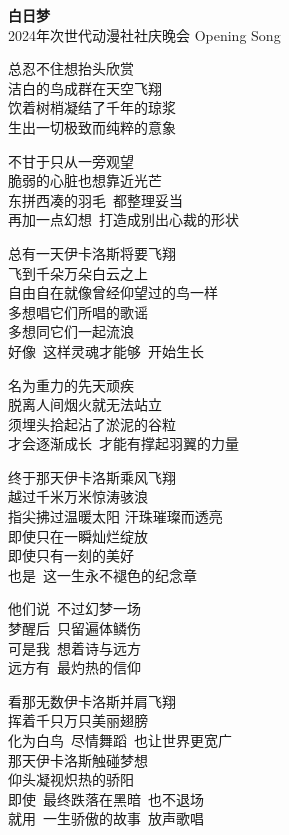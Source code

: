 \newpage  %
\vspace{3em}
\begin{center}
    \fontsize{25pt}{27pt}\selectfont
    \textbf{\textcolor{truepurple}{白日梦}}  %
    \\[0ex]  %
    \fontsize{15pt}{17pt}\selectfont
    \textcolor{thuorange}{2024年次世代动漫社社庆晚会 Opening Song}  %
\end{center}
\flushleft  %
\vspace{2em}
\begin{multicols}{2} 
总忍不住想抬头欣赏\\
洁白的鸟成群在天空飞翔\\
饮着树梢凝结了千年的琼浆\\
生出一切极致而纯粹的意象

\vspace{1em}
不甘于只从一旁观望\\
脆弱的心脏也想靠近光芒\\
东拼西凑的羽毛~都整理妥当\\
再加一点幻想~打造成别出心裁的形状

\vspace{1em}
总有一天伊卡洛斯将要飞翔\\
飞到千朵万朵白云之上\\
自由自在就像曾经仰望过的鸟一样\\
多想唱它们所唱的歌谣\\
多想同它们一起流浪\\
好像~这样灵魂才能够~开始生长 

\vspace{1em}
名为重力的先天顽疾\\
脱离人间烟火就无法站立\\
须埋头拾起沾了淤泥的谷粒\\
才会逐渐成长~才能有撑起羽翼的力量

\vspace{1em}
终于那天伊卡洛斯乘风飞翔\\
越过千米万米惊涛骇浪\\
指尖拂过温暖太阳 汗珠璀璨而透亮\\
即使只在一瞬灿烂绽放\\
即使只有一刻的美好\\
也是~这一生永不褪色的纪念章

\vspace{1em}
他们说~不过幻梦一场\\
梦醒后~只留遍体鳞伤\\
可是我~想着诗与远方\\
远方有~最灼热的信仰

\vspace{1em}
看那无数伊卡洛斯并肩飞翔\\
挥着千只万只美丽翅膀\\
化为白鸟~尽情舞蹈~也让世界更宽广\\
那天伊卡洛斯触碰梦想\\
仰头凝视炽热的骄阳\\
即使~最终跌落在黑暗~也不退场\\
就用~一生骄傲的故事~放声歌唱
\end{multicols}